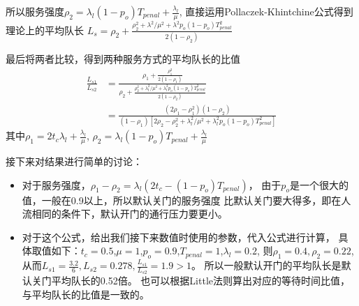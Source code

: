 所以服务强度$\rho_2=\lambda_l (1-p_o)T_{penal}+\frac{\lambda_l}{\mu}$,
直接运用Pollaczek-Khintchine公式得到理论上的平均队长
$L_s=\rho_2+\frac{\rho_2^2+\lambda^2/\mu^2+\lambda^2 p_o(1-p_o)T_{penal}^2}{2(1-\rho_2)}$
\par 最后将两者比较，得到两种服务方式的平均队长的比值
\begin{equation}
    \begin{aligned}
        \frac{L_{s1}}{L_{s2}}&=\frac{\rho_1+\frac{\rho_1^2}{2(1-\rho_1)}}{\rho_2+\frac{\rho_2^2+\lambda_l^2/\mu^2+\lambda_l^2 p_o(1-p_o)T_{penal}^2}{2(1-\rho_2)}} \\
        &=\frac{(2\rho_1-\rho_1^2)(1-\rho_2)}{(1-\rho_1)[2\rho_2-\rho_2^2+\lambda_l^2/\mu^2+\lambda_l^2 p_o(1-p_o)T_{penal}^2]}
    \end{aligned}
\end{equation}
其中$\rho_1=2t_c\lambda_l+\frac{\lambda_l}{\mu}$,
$\rho_2=\lambda_l (1-p_o)T_{penal}+\frac{\lambda_l}{\mu}$

接下来对结果进行简单的讨论：
\begin{itemize}
    \item 对于服务强度，$\rho_1-\rho_2=\lambda_l(2t_c-(1-p_o)T_{penal})$，
    由于$p_o$是一个很大的值，一般在0.9以上，所以默认关门的服务强度
    比默认关门要大得多，即在人流相同的条件下，默认开门的通行压力要更小。
    \item 对于这个公式，给出我们接下来数值时使用的参数，代入公式进行计算，
    具体取值如下：$t_c=0.5$,$\mu=1$,$p_o=0.9$,$T_{penal}=1$,$\lambda_l=0.2$,
    则$\rho_1=0.4,\rho_2=0.22$,从而$L_{s1}=\frac{3.2}{6},L_{s2}=0.278,\frac{L_{s1}}{L_{s2}}=1.9>1$。
    所以一般默认开门的平均队长是默认关门平均队长的0.52倍。
    也可以根据Little法则算出对应的等待时间比值，与平均队长的比值是一致的。
\end{itemize}

